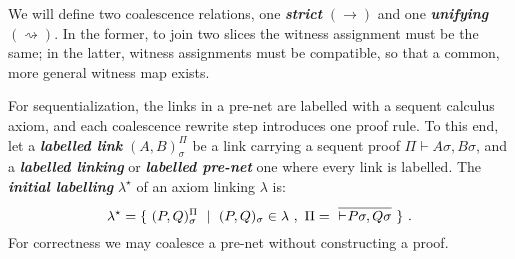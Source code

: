 \documentclass[UKenglish]{lipics-v2016}
\theoremstyle{plain}
\newcommand\defn[1]{\textit{\textbf{#1}}}
\newcommand\+{+}
\renewcommand\*{\times}
\newcommand\seq[3][]{{\vdash_{#1}}#2,#3}
\newcommand\prf[3]{#1\vdash\!#2,#3}
\newcommand\link[3][\sigma]{(#2,#3)_{#1}}
\newcommand\scoal{\rightarrow} %
\newcommand\ucoal{\rightsquigarrow}
\begin{document}
We will define two coalescence relations, one \defn{strict} $(\scoal)$ and one \defn{unifying} $(\ucoal)$. In the former, to join two slices the witness assignment must be the same; in the latter, witness assignments must be compatible, so that a common, more general witness map exists. 

For sequentialization, the links in a pre-net are labelled with a sequent calculus axiom, and each coalescence rewrite step introduces one proof rule. To this end, let a \defn{labelled link} $\link AB^\Pi$ be a link carrying a sequent proof $\prf\Pi{A\sigma}{B\sigma}$, and a \defn{labelled linking} or \defn{labelled pre-net} one where every link is labelled. The \defn{initial labelling} $\lambda^\star$ of an axiom linking $\lambda$ is:
\[
	\lambda^\star = \{~\link PQ^\Pi~\mid~\link PQ\in\lambda~,~\Pi=~\infer{\seq{P\sigma}{Q\sigma}}{}~\}~.
\]
For correctness we may coalesce a pre-net without constructing a proof. 
\end{document}
